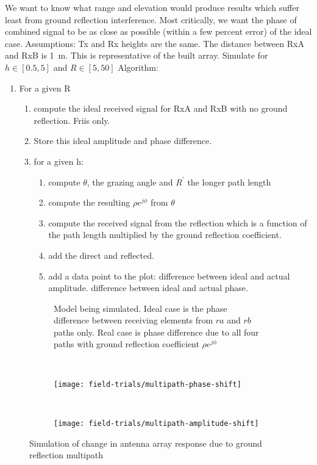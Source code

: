 We want to know what range and elevation would produce results which suffer least from ground reflection interference. Most critically, we want the phase of combined signal to be as close as possible (within a few percent error) of the ideal case. 
Assumptions: Tx and Rx heights are the same. The distance between RxA and RxB is \SI{1}{\meter}. This is representative of the built array. Simulate for \(h \in \left[ 0.5 , 5 \right]\) and \(R \in \left[5, 50\right]\)
Algorithm:
\begin{enumerate}
  \item For a given R
    \begin{enumerate}
      \item compute the ideal received signal for RxA and RxB with no ground reflection. Friis only.
      \item Store this ideal amplitude and phase difference.
      \item for a given h:
        \begin{enumerate}
          \item compute \(\theta\), the grazing angle and \(R^\prime\) the longer path length
          \item compute the resulting \(\rho e^{j\phi}\) from \(\theta\)
          \item compute the received signal from the reflection which is a function of the path length multiplied by the ground reflection coefficient. 
          \item add the direct and reflected.
          \item add a data point to the plot: difference between ideal and actual amplitude. difference between ideal and actual phase.
        \end{enumerate}
    \end{enumerate}
\end{enumerate}

\begin{figure}
  \centering
  \begin{subfigure}{\textwidth}
    \centering
    
    \caption{Model being simulated. Ideal case is the phase difference between receiving elements from \(ra\) and \(rb\) paths only. Real case is phase difference due to all four paths with ground reflection coefficient \(\rho e^{j\phi}\)}
  \end{subfigure}\\[3ex]
  \begin{subfigure}{\textwidth}
    \centering
    \texttt{[image: field-trials/multipath-phase-shift]}
  \end{subfigure}\\[2ex]
  \begin{subfigure}{\textwidth}
    \centering
    \texttt{[image: field-trials/multipath-amplitude-shift]}
  \end{subfigure}
  \caption{Simulation of change in antenna array response due to ground reflection multipath}
\end{figure}

